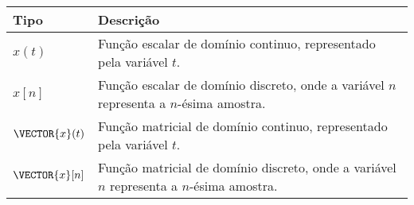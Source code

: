\begin{notation}~\\
\begin{tabular}{p{} | p{} }
\hline	
\textbf{Tipo}            & \textbf{Descrição} \\ \hline
$x(t)$          & Função escalar de domínio continuo, representado pela variável $t$. \\ \hline
$x[n]$          & Função escalar de domínio discreto, onde a variável $n$ representa a $n$-ésima amostra. \\ \hline
$\VECTOR{x}(t)$ & Função matricial de domínio continuo, representado pela variável $t$.  \\ \hline
$\VECTOR{x}[n]$ & Função matricial de domínio discreto, onde a variável $n$ representa a $n$-ésima amostra. \\
\hline
\end{tabular}
\end{notation}

